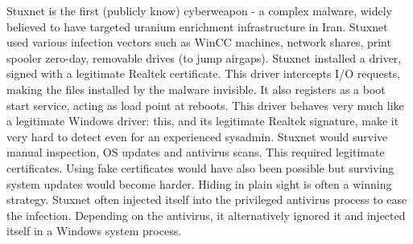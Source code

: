 \documentclass[11pt,oneside,a4paper]{article}
\begin{document}
Stuxnet is the first (publicly know) cyberweapon - a complex malware, widely believed to have targeted uranium enrichment infrastructure in Iran. Stuxnet used various infection vectors such as WinCC machines, network shares, print spooler zero-day, removable drives (to jump airgaps). Stuxnet installed a driver, signed with a legitimate Realtek certificate. This driver intercepts I/O requests, making the files installed by the malware invisible. It also registers as a boot start service, acting as load point at reboots. This driver behaves very much like a legitimate Windows driver: this, and its legitimate Realtek signature, make it very hard to detect even for an experienced sysadmin. Stuxnet would survive manual inspection, OS updates and antivirus scans. This required legitimate certificates. Using fake certificates would have also been possible but surviving system updates would become harder. Hiding in plain sight is often a winning strategy. Stuxnet often injected itself into the privileged antivirus process to ease the infection. Depending on the antivirus, it alternatively ignored it and injected itself in a Windows system process. 






\label{lastpage} %
\clearpage
{}



\clearpage
\appendix
{}
\end{document}
